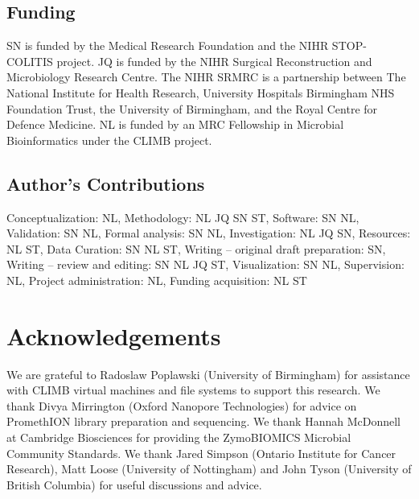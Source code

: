\documentclass[a4paper,num-refs]{oup-contemporary}
\begin{document}
\subsection{Funding}
SN is funded by the Medical Research Foundation and the NIHR STOP-COLITIS project.
JQ is funded by the NIHR Surgical Reconstruction and Microbiology Research Centre. 
The NIHR SRMRC is a partnership between The National Institute for Health Research, University Hospitals Birmingham NHS Foundation Trust, the University of Birmingham, and the Royal Centre for Defence Medicine.
NL is funded by an MRC Fellowship in Microbial Bioinformatics under the CLIMB project.

\subsection{Author's Contributions}
Conceptualization: NL, Methodology: NL JQ SN ST, Software: SN NL, Validation: SN NL, Formal analysis: SN NL, Investigation: NL JQ SN, Resources: NL ST, Data Curation: SN NL ST, Writing – original draft preparation: SN, Writing – review and editing: SN NL JQ ST, Visualization: SN NL, Supervision: NL, Project administration: NL, Funding acquisition: NL ST



\section{Acknowledgements}

We are grateful to Radoslaw Poplawski (University of Birmingham) for assistance with CLIMB virtual machines and file systems to support this research. We thank Divya Mirrington (Oxford Nanopore Technologies) for advice on PromethION library preparation and sequencing. We thank Hannah McDonnell at Cambridge Biosciences for providing the ZymoBIOMICS Microbial Community Standards. We thank Jared Simpson (Ontario Institute for Cancer Research), Matt Loose (University of Nottingham) and John Tyson (University of British Columbia) for useful discussions and advice.





\end{document}
